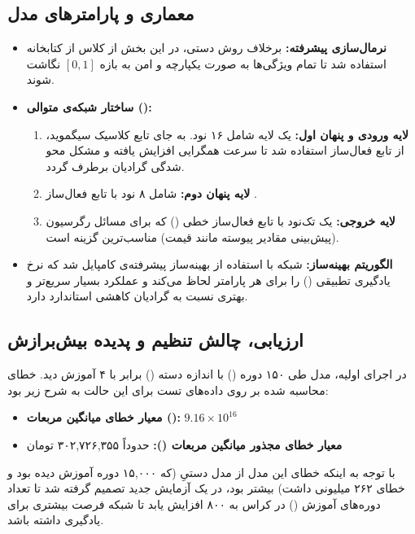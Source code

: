 \documentclass[12pt, a4paper]{article}
\begin{document}
\subsection{معماری و پارامترهای مدل}
\begin{itemize}
	\item \textbf{نرمال‌سازی پیشرفته:} برخلاف روش دستی، در این بخش از کلاس  از کتابخانه  استفاده شد تا تمام ویژگی‌ها به صورت یکپارچه و امن به بازه $[0, 1]$ نگاشت شوند.
	\item \textbf{ساختار شبکه‌ی متوالی ():}
	\begin{enumerate}
		\item \textbf{لایه ورودی و پنهان اول:} یک لایه  شامل ۱۶ نود. به جای تابع کلاسیک سیگموید، از تابع فعال‌ساز  استفاده شد تا سرعت همگرایی افزایش یافته و مشکل محو شدگی گرادیان برطرف گردد.
		\item \textbf{لایه پنهان دوم:} شامل ۸ نود با تابع فعال‌ساز .
		\item \textbf{لایه خروجی:} یک تک‌نود با تابع فعال‌ساز خطی () که برای مسائل رگرسیون (پیش‌بینی مقادیر پیوسته مانند قیمت) مناسب‌ترین گزینه است.
	\end{enumerate}
	\item \textbf{الگوریتم بهینه‌ساز:} شبکه با استفاده از بهینه‌ساز پیشرفته‌ی  کامپایل شد که نرخ یادگیری تطبیقی () را برای هر پارامتر لحاظ می‌کند و عملکرد بسیار سریع‌تر و بهتری نسبت به گرادیان کاهشی استاندارد دارد.
\end{itemize}

\subsection{ارزیابی، چالش تنظیم  و پدیده بیش‌برازش}
در اجرای اولیه، مدل طی ۱۵۰ دوره () با اندازه دسته () برابر با ۴ آموزش دید. خطای محاسبه شده بر روی داده‌های تست برای این حالت به شرح زیر بود:
\begin{itemize}
	\item \textbf{معیار خطای میانگین مربعات ():} $9.16 \times 10^{16}$
	\item \textbf{معیار خطای مجذور میانگین مربعات ():} حدوداً ۳۰۲,۷۲۶,۳۵۵ تومان
\end{itemize}

با توجه به اینکه خطای این مدل از مدل دستیِ  (که ۱۵,۰۰۰ دوره آموزش دیده بود و خطای ۲۶۲ میلیونی داشت) بیشتر بود، در یک آزمایش جدید تصمیم گرفته شد تا تعداد دوره‌های آموزش () در کراس به ۸۰۰ افزایش یابد تا شبکه فرصت بیشتری برای یادگیری داشته باشد. 
\end{document}
